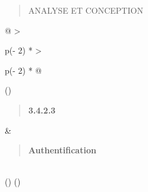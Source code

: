 \documentclass[
]{article}
\begin{document}
\begin{quote}
ANALYSE ET CONCEPTION
\end{quote}

\begin{longtable}[]{@{}
  >{\raggedright\arraybackslash}p{(\columnwidth - 2\tabcolsep) * }
  >{\raggedright\arraybackslash}p{(\columnwidth - 2\tabcolsep) * }@{}}
\toprule()
\begin{minipage}[b]{\linewidth}\raggedright
\begin{quote}
\textbf{3.4.2.3}
\end{quote}
\end{minipage} & \begin{minipage}[b]{\linewidth}\raggedright
\begin{quote}
\textbf{Authentification}
\end{quote}
\end{minipage} \\
\midrule()
\endhead
\bottomrule()
\end{longtable}
\end{document}
